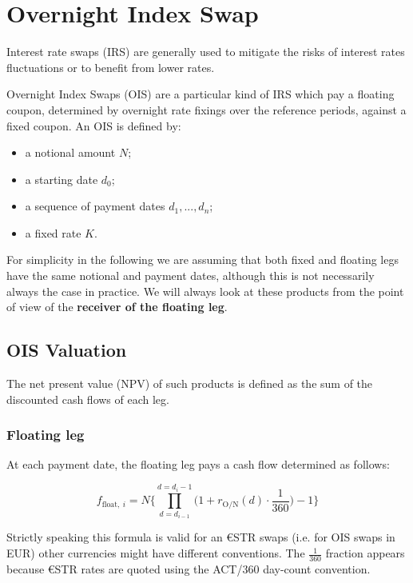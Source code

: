 \section{Overnight Index Swap}\label{overnight-index-swap}

Interest rate swaps (IRS) are generally used to mitigate the risks of interest rates fluctuations or to benefit from lower rates.

Overnight Index Swaps (OIS) are a particular kind of IRS which pay a floating coupon, determined by overnight rate fixings over the reference periods, against a fixed coupon. An OIS is defined by:

\begin{itemize}
\tightlist
\item
  a notional amount $N$;
\item
  a starting date $d_0$;
\item
  a sequence of payment dates $d_1,...,d_n$;
\item
  a fixed rate $K$.
\end{itemize}

For simplicity in the following we are assuming that both fixed and floating legs have the same notional and payment dates, although this is not necessarily always the case in practice. We will always look at these products from the point of view of the \textbf{receiver of the floating leg}.

\subsection{OIS Valuation}\label{ois-valuation}
The net present value (NPV) of such products is defined as the sum of the discounted cash flows of each leg.

\subsubsection{Floating leg}\label{floating-leg}
At each payment date, the floating leg pays a cash flow determined as follows:

\begin{equation}
f_{\mathrm{float},~i} = N \Bigg\{\prod_{d=d_{i-1}}^{d=d_i-1}\Big(1+r_{\mathrm{O/N}}(d)\cdot\frac{1}{360}\Big) -1 \Bigg\}
\label{eq:floating_ois}
\end{equation}

Strictly speaking this formula is valid for an \euro STR swaps (i.e. for OIS swaps in EUR) other currencies might have different conventions. The $\frac{1}{360}$ fraction appears because \euro STR rates are quoted using the ACT/360 day-count convention. 

